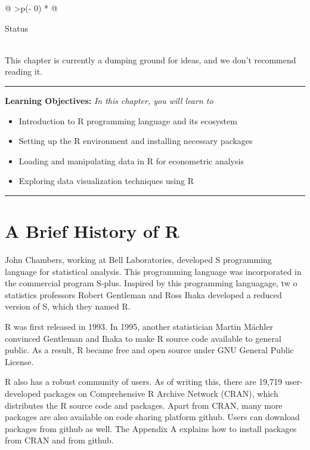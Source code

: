 \documentclass[
  letterpaper,
  paper =a4,
  twoside,
  openright,
  headsepline,
  footsepline,
  listof = totocnumbered,
  chapterprefix = true,
  firstiscover]{scrbook}
\providecommand{\abstractname}{Learning Objectives} %
\newenvironment{objectives}[1]{%
	\hrule
	\vspace{5pt}
	\small\textbf{\abstractname: } 
	\newline
	\vspace{0.1cm}
	\small\emph{#1} %
	\itshape %
}{%
	\vspace{5pt}
	\hrule
	\vspace{0.6cm}
}
\begin{document}
\begin{longtable}[]{@{}
  >{\centering\arraybackslash}p{(\columnwidth - 0\tabcolsep) * }@{}}
\toprule\noalign{}
\begin{minipage}[b]{\linewidth}\centering
Status
\end{minipage} \\
\midrule\noalign{}
\endhead
\bottomrule\noalign{}
\endlastfoot
This chapter is currently a dumping ground for ideas, and we don't
recommend reading it. \\
\end{longtable}

\begin{objectives}{In this chapter, you will learn to}
\begin{itemize}

\item{Introduction to R programming language and its ecosystem}

\item{Setting up the R environment and installing necessary packages}

\item{Loading and manipulating data in R for econometric analysis}

\item{Exploring data visualization techniques using R}

\end{itemize}

\end{objectives}

\hypertarget{a-brief-history-of-r}{%
\section{A Brief History of R}\label{a-brief-history-of-r}}

John Chambers, working at Bell Laboratories, developed S programming
language for statistical analysis. This programming language was
incorporated in the commercial program S-plus. Inspired by this
programming languagage, tw o statistics professors Robert Gentleman and
Ross Ihaka developed a reduced version of S, which they named R.

R was first released in 1993. In 1995, another statistician Martin
Mächler convinced Gentleman and Ihaka to make R source code available to
general public. As a result, R became free and open source under GNU
General Public License.

R also has a robust community of users. As of writing this, there are
19,719 user-developed packages on Comprehensive R Archive Network
(CRAN), which distributes the R source code and packages. Apart from
CRAN, many more packages are also available on code sharing platform
github. Users can download packages from github as well. The Appendix A
explains how to install packages from CRAN and from github.
\end{document}
